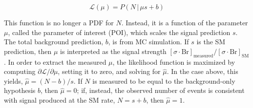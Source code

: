 \begin{equation}
\mathscr{L}(\mu) = P(N\,|\,\mu s + b)
\label{chap:statistics:equation:simple_likelihood}
\end{equation}

\noindent
This function is no longer a PDF for $N$. Instead, it is a function
of the parameter $\mu$, called the parameter of interest (POI), which
scales the signal prediction $s$. The total
background prediction, $b$, is from MC simulation. If
$s$ is the SM prediction, then $\mu$ is interpreted as the signal
strength
$\left[\sigma\cdot\textrm{Br}\right]_{\textrm{measured}}/\left[\sigma\cdot\textrm{Br}\right]_{\textrm{SM}}$. In
order to extract the measured
$\mu$, the likelihood function is maximized by computing
$\partial \mathscr{L}/\partial \mu$, setting it to zero, and solving
for $\hat{\mu}$. In the case above, this yields, $\hat{\mu} = (N -
b)/s$. If $N$ is measured to be equal to the background-only hypothesis
$b$, then $\hat{\mu} = 0$; if, instead, the observed number of events
is consistent with signal produced at the SM rate, $N = s + b$, then
$\hat{\mu} = 1$.
